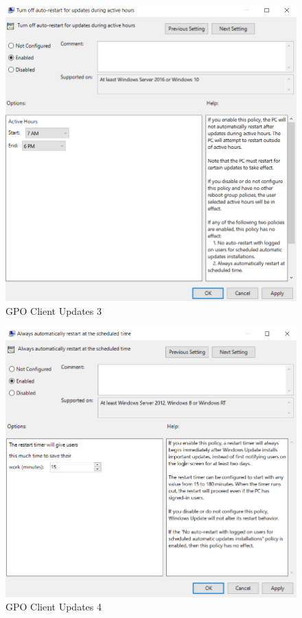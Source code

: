 \begin{minipage}{0.5\linewidth}
    \begin{figure}[H]
        \centering
        \includegraphics[width=\linewidth]{../img/Updates/client-auto-restart-during-working-hours.png}
        \caption{GPO Client Updates 3}
    \end{figure}
\end{minipage}
\begin{minipage}{0.5\linewidth}
    \begin{figure}[H]
        \centering
        \includegraphics[width=\linewidth]{../img/Updates/server-automatic-restart.png}
        \caption{GPO Client Updates 4}
    \end{figure}
\end{minipage}\\

